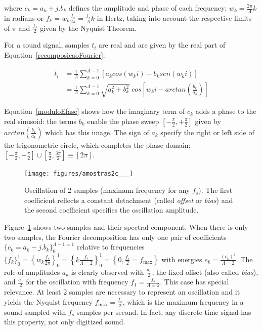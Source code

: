 \noindent where $c_k = a_k + j . b_k$ defines the amplitude and phase of each frequency: $w_k=\frac{2\pi}{\Lambda}k$ in radians or $f_k=w_k\frac{f_s}{2\pi}=\frac{f_s}{\Lambda}k$ in Hertz, taking into account the respective limits of $\pi$ and $\frac{f_s}{2}$ given by the Nyquist Theorem.

For a sound signal, samples $t_i$ are real and are given by the real part of Equation~\ref{recomposicaoFourier}:

\begin{equation}\label{moduloEfase}
\begin{split}
t_i& = \frac{1}{\Lambda}\sum_{k=0}^{\Lambda-1}\left[a_k cos(w_k i) -b_k sen(w_k i)\right] \\
   & = \frac{1}{\Lambda}\sum_{k=0}^{\Lambda-1}\sqrt{a_k^2 + b_k^2} \; cos\left[w_k i - arctan\left(\frac{b_k}{a_k}\right)\right]
\end{split}
\end{equation}

Equation~\ref{moduloEfase} shows how the imaginary term of $c_k$ adds a phase to the real sinusoid: the terms $b_k$ enable the phase sweep $\left[-\frac{\pi}{2},+\frac{\pi}{2}\right]$ given by $arctan\left(\frac{b_k}{a_k}\right)$ which has this image. The sign of $a_k$ specify the right or left side of the trigonometric circle, which completes the phase domain: $\left[-\frac{\pi}{2},+\frac{\pi}{2}\right] \cup \left[\frac{\pi}{2},\frac{3\pi}{2}\right]\equiv [2\pi]$.

 \begin{figure}
     \centering
         \texttt{[image: figures/amostras2c\_\_\_]}
     \caption{Oscillation of 2 samples (maximum frequency for any $f_s$). The first coefficient reflects a constant detachment (called \emph{offset} or \emph{bias}) and the second coefficient specifies the oscillation amplitude.}
         \label{fig:amostras2}
 \end{figure}

Figure~\ref{fig:amostras2} shows two samples and their spectral component. When there is only two samples, the Fourier decomposition has only one pair of coefficients $\{c_k=a_k-j.b_k\}_0^{\Lambda-1=1}$ relative to frequencies $\{f_k\}_0^1=\left\{w_k\frac{f_s}{2\pi}\right\}_0^1=\left\{k\frac{f_s}{\Lambda=2}\right\}_0^1=\left\{0,\frac{f_s}{2}=f_{\text{max}}\right\}$
with energies $e_k=\frac{(c_k)^2}{\Lambda=2}$. The role of amplitudes $a_k$ is clearly observed with $\frac{a_0}{2}$, the fixed offset (also called \emph{bias}), and $\frac{a_1}{2}$ for the oscillation with frequency $f_1=\frac{f_s}{\Lambda=2}$.
This case has special relevance. At least 2 samples are necessary to represent an oscillation and it yields the Nyquist frequency $f_{\text{max}}=\frac{f_s}{2}$, which is the maximum frequency in a sound sampled with $f_s$ samples per second. In fact, any discrete-time signal has this property, not only digitized sound.

